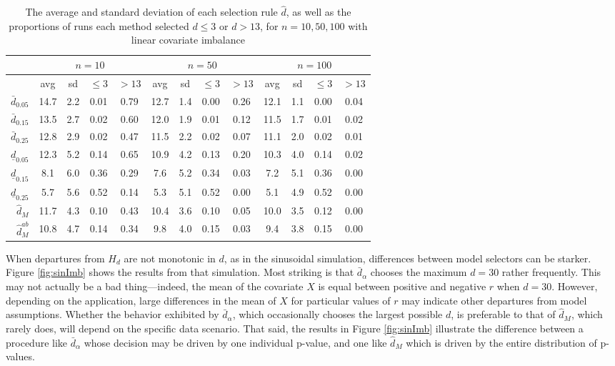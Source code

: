 \documentclass[12pt]{article}\usepackage[]{graphicx}\usepackage[]{color}
\newcommand{\dalphaU}{\bar{d}_\alpha}
\newcommand{\dhatU}{\bar{d}}
\newcommand{\dhatB}{\underline{d}}
\newcommand{\dhatm}{\hat{d}_M}
\newcommand{\dhatmab}{\hat{d}^{ab}_M}
\begin{document}
\begin{table}[ht]
\centering
\begin{tabular}{r|cccc|cccc|cccc|}
  & \multicolumn{4}{c}{$n=10$}&\multicolumn{4}{c}{$n=50$} &\multicolumn{4}{c}{$n=100$}\\
 \hline
 & avg & sd & $\le 3$ & $>13$ & avg & sd & $\le 3$ & $>13$ & avg & sd & $\le 3$ & $>13$ \\ 
  \hline
$\dhatU_{0.05}$ & 14.7 & 2.2 & 0.01 & 0.79 & 12.7 & 1.4 & 0.00 & 0.26 & 12.1 & 1.1 & 0.00 & 0.04 \\ 
  $\dhatU_{0.15}$ & 13.5 & 2.7 & 0.02 & 0.60 & 12.0 & 1.9 & 0.01 & 0.12 & 11.5 & 1.7 & 0.01 & 0.02 \\ 
  $\dhatU_{0.25}$ & 12.8 & 2.9 & 0.02 & 0.47 & 11.5 & 2.2 & 0.02 & 0.07 & 11.1 & 2.0 & 0.02 & 0.01 \\ 
  $\dhatB_{0.05}$ & 12.3 & 5.2 & 0.14 & 0.65 & 10.9 & 4.2 & 0.13 & 0.20 & 10.3 & 4.0 & 0.14 & 0.02 \\ 
  $\dhatB_{0.15}$ & 8.1 & 6.0 & 0.36 & 0.29 & 7.6 & 5.2 & 0.34 & 0.03 & 7.2 & 5.1 & 0.36 & 0.00 \\ 
  $\dhatB_{0.25}$ & 5.7 & 5.6 & 0.52 & 0.14 & 5.3 & 5.1 & 0.52 & 0.00 & 5.1 & 4.9 & 0.52 & 0.00 \\ 
  $\dhatm$ & 11.7 & 4.3 & 0.10 & 0.43 & 10.4 & 3.6 & 0.10 & 0.05 & 10.0 & 3.5 & 0.12 & 0.00 \\ 
  $\dhatmab$ & 10.8 & 4.7 & 0.14 & 0.34 & 9.8 & 4.0 & 0.15 & 0.03 & 9.4 & 3.8 & 0.15 & 0.00 \\ 
   \hline
\end{tabular}
\caption{The average and standard deviation of each selection rule $\hat{d}$, as well as the proportions of runs each method selected $d\le 3$ or $d>13$, for $n=10,50,100$ with linear covariate imbalance} 
\label{tab:linear}
\end{table}


When departures from $H_d$ are not monotonic in $d$, as in the
sinusoidal simulation, differences between model selectors can be
starker.
Figure \ref{fig:sinImb} shows the results from that simulation.
Most striking is that $\dalphaU$ chooses the maximum $d=30$ rather
frequently.
This may not actually be a bad thing---indeed, the mean of the
covariate $X$ is equal between positive and negative $r$ when $d=30$.
However, depending on the application, large differences in the mean
of $X$ for particular values of $r$ may indicate other departures from
model assumptions.
Whether the behavior exhibited by $\dalphaU$, which occasionally
chooses the largest possible $d$, is preferable to that of $\dhatm$,
which rarely does, will depend on the specific data scenario.
That said, the results in Figure \ref{fig:sinImb} illustrate the
difference between a procedure like $\dalphaU$ whose decision may be driven by one
individual p-value, and one like $\dhatm$ which is driven by the
entire distribution of p-values.
\end{document}
